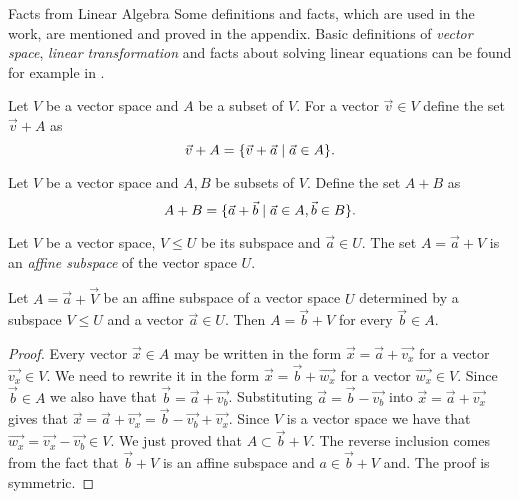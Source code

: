 \begin{chapter}{Facts from Linear Algebra}
Some definitions and facts, which are used in the work, are mentioned and proved in the appendix. Basic definitions of \emph{vector space}, \emph{linear transformation} and facts about solving linear equations can be found for example in \cite{meyer01}.

\label{appendix-linear-algebra}
\begin{definition}
Let $V$ be a vector space and $A$ be a subset of $V$. For a vector $\vec{v} \in V$ define the set $\vec{v} + A$ as
\[ \vec{v} + A = \{ \vec{v} + \vec{a} \mid \vec{a} \in A \} \text{.} \] 
\end{definition}

\begin{definition}
Let $V$ be a vector space and $A, B$ be subsets of $V$. Define the set $A + B$ as
\[ A + B = \{ \vec{a} + \vec{b} \mid \vec{a} \in A, \vec{b} \in B \} \text{.} \] 
\end{definition}

\begin{definition}
\label{definition-affine-subspace}
Let $V$ be a vector space, $V \leq U$ be its subspace and $\vec{a} \in U$. The set $A = \vec{a} + V$ is an \emph{affine subspace} of the vector space $U$.
\end{definition}

\begin{lemma}
\label{lemma-affine-subspace-equality}
Let $A = \vec{a} + \vec{V}$ be an affine subspace of a vector space $U$ determined by a subspace $V \leq U$ and a vector $\vec{a} \in U$. Then $A = \vec{b} + V$ for every $\vec{b} \in A$.
\end{lemma}
\begin{proof}
Every vector $\vec{x} \in A$ may be written in the form $\vec{x} = \vec{a} + \vec{v_x}$ for a vector $\vec{v_x} \in V$. We need to rewrite it in the form $\vec{x} = \vec{b} + \vec{w_x}$ for a vector $\vec{w_x} \in V$. Since $\vec{b} \in A$ we also have that $\vec{b} = \vec{a} + \vec{v_b}$. Substituting $\vec{a} = \vec{b} - \vec{v_b}$ into $\vec{x} = \vec{a} + \vec{v_x}$ gives that $\vec{x} = \vec{a} + \vec{v_x} = \vec{b} - \vec{v_b} + \vec{v_x}$. Since $V$ is a vector space we have that $\vec{w_x} = \vec{v_x} - \vec{v_b} \in V$. We just proved that $A \subset \vec{b} + V$. The reverse inclusion comes from the fact that $\vec{b} + V$ is an affine subspace and $a \in \vec{b} + V$ and. The proof is symmetric.
\end{proof}


\end{chapter}
